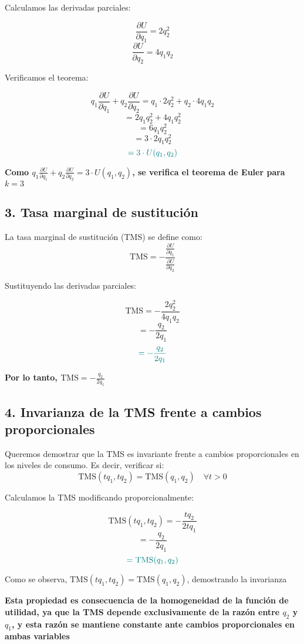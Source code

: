 \documentclass{article}
\begin{document}
Calculamos las derivadas parciales:

\[
\frac{\partial U}{\partial q_1} = 2q_2^2
\]
\[
\frac{\partial U}{\partial q_2} = 4q_1q_2
\]

Verificamos el teorema:

\[
q_1\frac{\partial U}{\partial q_1} + q_2\frac{\partial U}{\partial q_2} = q_1 \cdot 2q_2^2 + q_2 \cdot 4q_1q_2
\]
\[
= 2q_1q_2^2 + 4q_1q_2^2
\]
\[
= 6q_1q_2^2
\]
\[
= 3 \cdot 2q_1q_2^2
\]
\[
\color{teal}
= 3 \cdot U(q_1,q_2)
\]

\textbf{\color{teal}Como \(q_1\frac{\partial U}{\partial q_1} + q_2\frac{\partial U}{\partial q_2} = 3 \cdot U(q_1,q_2)\), se verifica el teorema de Euler para \(k=3\)}

\subsection*{3. Tasa marginal de sustitución}

La tasa marginal de sustitución (TMS) se define como:
\[
\text{TMS} = -\frac{\frac{\partial U}{\partial q_1}}{\frac{\partial U}{\partial q_2}}
\]

Sustituyendo las derivadas parciales:

\[
\text{TMS} = -\frac{2q_2^2}{4q_1q_2}
\]
\[
= -\frac{q_2}{2q_1}
\]
\[
\color{teal}
= -\frac{q_2}{2q_1}
\]

\textbf{\color{teal}Por lo tanto, \(\text{TMS} = -\frac{q_2}{2q_1}\)}

\subsection*{4. Invarianza de la TMS frente a cambios proporcionales}

Queremos demostrar que la TMS es invariante frente a cambios proporcionales en los niveles de consumo. Es decir, verificar si:
\[
\text{TMS}(tq_1,tq_2) = \text{TMS}(q_1,q_2) \quad \forall t > 0
\]

Calculamos la TMS modificando proporcionalmente:

\[
\text{TMS}(tq_1,tq_2) = -\frac{tq_2}{2tq_1}
\]
\[
= -\frac{q_2}{2q_1}
\]
\[
\color{teal}
= \text{TMS}(q_1,q_2)
\]

Como se observa, \(\text{TMS}(tq_1,tq_2) = \text{TMS}(q_1,q_2)\), demostrando la invarianza

\textbf{\color{teal}Esta propiedad es consecuencia de la homogeneidad de la función de utilidad, ya que la TMS depende exclusivamente de la razón entre \(q_2\) y \(q_1\), y esta razón se mantiene constante ante cambios proporcionales en ambas variables}
\end{document}
